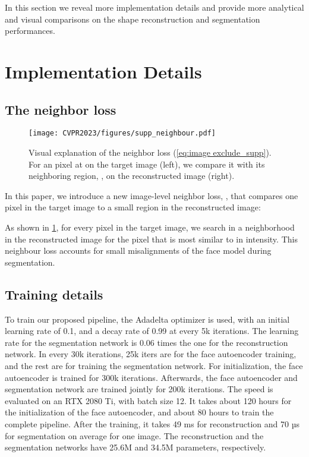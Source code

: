 \documentclass[10pt,twocolumn,letterpaper]{article}
\begin{document}
\setcounter{table}{0}

\setcounter{figure}{0}
\setcounter{page}{1}
In this section we reveal more implementation details and provide more analytical and visual comparisons on the shape reconstruction and segmentation performances.
\section{Implementation Details}


\subsection{The neighbor loss
}

\begin{figure}[h!]
  \centering
  
  \texttt{[image: CVPR2023/figures/supp\_neighbour.pdf]}

    \caption{Visual explanation of the neighbor loss (\cref{eq:image exclude_supp}). For an pixel at  on the target image  (left), we compare it with its neighboring region, , on the reconstructed image  (right).}
 \label{Fig:Neighbor Loss}
\end{figure}

In this paper, we introduce a new image-level neighbor loss, , that compares one pixel in the target image to a small region in the reconstructed image:

  
  As shown in \cref{Fig:Neighbor Loss}, for every pixel  in the target image, we search in a  neighborhood  in the reconstructed image   for the pixel that is most similar to  in intensity. This neighbour loss accounts for small misalignments of the face model during segmentation.

\subsection{Training details}

 To train our proposed pipeline, the Adadelta optimizer is used, with an initial learning rate of 0.1, and a decay rate of 0.99 at every 5k iterations. The learning rate for the segmentation network is 0.06 times the one for the reconstruction network. In every 30k iterations, 25k iters are for the face autoencoder training, and the rest are for training the segmentation network. For initialization, the face autoencoder is trained for 300k iterations. Afterwards, the face autoencoder and segmentation network are trained jointly for 200k iterations. The speed is evaluated on an RTX 2080 Ti, with batch size 12. 
It takes about 120 hours for the initialization of the face autoencoder, and about 80 hours to train the complete pipeline.
After the training, it takes 49 ms for reconstruction and 70 µs for segmentation on average for one image. The reconstruction
and the segmentation networks have 25.6M and 34.5M parameters,
respectively.
\end{document}
